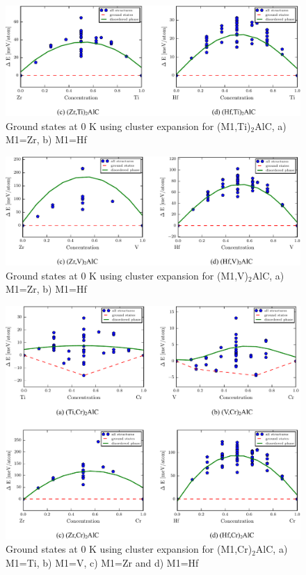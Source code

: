 \documentclass[preprint,amsmath,amssymb,aps, prb,showkeys]{revtex4-1}
\begin{document}
\begin{figure}
\centering
\includegraphics[scale=0.5]{figure_19.pdf}   
\caption{Ground states at 0 K using cluster expansion for (M1,Ti)$_2$AlC, a) M1=Zr, b) M1=Hf }
\end{figure}

\begin{figure}
\centering
\includegraphics[scale=0.5]{figure_20.pdf}    
\caption{Ground states at 0 K using cluster expansion for (M1,V)$_2$AlC, a) M1=Zr, b) M1=Hf }
\end{figure}

\begin{figure}
\centering
\includegraphics[scale=0.5]{figure_21.pdf}   
\caption{Ground states at 0 K using cluster expansion for (M1,Cr)$_2$AlC, a) M1=Ti, b) M1=V, c) M1=Zr and d) M1=Hf }
\end{figure}
\end{document}
